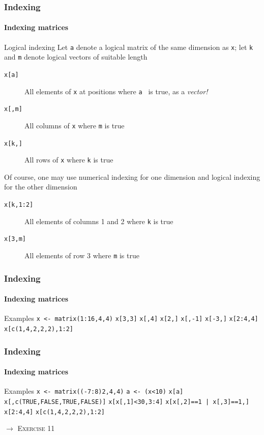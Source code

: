 \documentclass[title={Introduction to R}, author={Mutschler and Zaharieva}, inst={Institute for Econometrics and Empirical Economics}]{beamer}
\begin{document}
\begin{frame}
\frametitle{Indexing}
\framesubtitle{Indexing matrices}
Logical indexing
Let \texttt{a} denote a logical matrix of the same dimension as \texttt{x}; 
\newline
let \texttt{k} and \texttt{m} denote logical vectors of suitable length
\begin{description}
\item[{\texttt{x[a]}}] All elements of \texttt{x} at positions where \texttt{a%
} is true, \newline
as a \emph{vector!}
\item[{\texttt{x[,m]}}] All columns of \texttt{x} where \texttt{m} is true
\item[{\texttt{x[k,]}}] All rows of \texttt{x} where \texttt{k} is true
\end{description}
Of course, one may use numerical indexing for one dimension \newline
and logical indexing for the other dimension
\begin{description}
\item[{\texttt{x[k,1:2]}}] All elements of columns 1 and 2 where \texttt{k}
is true
\item[{\texttt{x[3,m]}}] All elements of row 3 where \texttt{m} is true
\end{description}
\end{frame}


\begin{frame}
\frametitle{Indexing}
\framesubtitle{Indexing matrices}
\begin{block}{Examples}
\texttt{x <- matrix(1:16,4,4)}\newline
\texttt{x[3,3]}\newline
\texttt{x[,4]}\newline
\texttt{x[2,]}\newline
\texttt{x[,-1]}\newline
\texttt{x[-3,]}\newline
\texttt{x[2:4,4]}\newline
\texttt{x[c(1,4,2,2,2),1:2]}\newline
\end{block}
\end{frame}


\begin{frame}
\frametitle{Indexing}
\framesubtitle{Indexing matrices}
\begin{block}{Examples}
\texttt{x <- matrix((-7:8)2,4,4)}\newline
\texttt{a <- (x<10)}\newline
\texttt{x[a]}\newline
\texttt{x[,c(TRUE,FALSE,TRUE,FALSE)]}\newline
\texttt{x[x[,1]<30,3:4]}\newline
\texttt{x[x[,2]==1 | x[,3]==1,]}\newline
\texttt{x[2:4,4]}\newline
\texttt{x[c(1,4,2,2,2),1:2]}
\end{block}\pause
$\longrightarrow $ \textsc{Exercise 11}
\end{frame}
\end{document}
